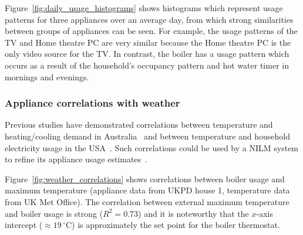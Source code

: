 \documentclass{sig-alternate}
\newcommand{\bluecolor}[1]{\textcolor{blue}{#1}}
\begin{document}
\noindent
Figure~\ref{fig:daily_usage_histograms} shows histograms which represent usage patterns for three appliances over
an average day, from which strong similarities between groups of appliances can be seen.  For
example, the usage patterns of the TV and Home theatre PC are very
similar because the Home theatre PC is the only video source for the TV. In contrast, the boiler has a usage pattern which occurs as a result of the household's occupancy pattern and hot water timer in mornings and evenings.

\subsubsection{Appliance correlations with weather}
\label{sec:weather_correlation}
\noindent
Previous studies have demonstrated correlations
between temperature and heating/cooling demand in
Australia~\cite{RicharddeDear2002} and between temperature and household electricity usage in the USA~\cite{Kavousian2013a}.  
Such correlations could be used by a NILM system to refine its appliance usage estimates~\cite{wytock_2013}.

Figure~\ref{fig:weather_correlations} shows correlations between
boiler usage and maximum temperature (appliance data from UKPD house 1, temperature data from UK Met Office).  The correlation between
external maximum temperature and boiler usage is strong ($R^2=0.73$) and it is
noteworthy that the $x$-axis intercept ($\approx19\,^{\circ}\mathrm{C}$)
is approximately the set point for the boiler thermostat.

\end{document}
